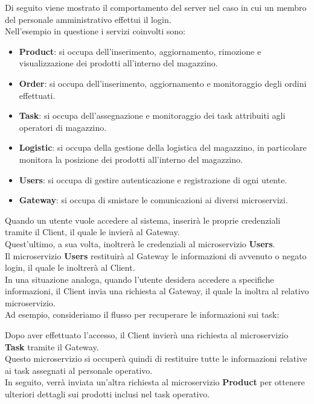 Di seguito viene mostrato il comportamento del server nel caso in cui un membro del personale amministrativo
effettui il login.\\ Nell’esempio in questione i servizi coinvolti sono:

\begin{itemize}
    \item \textbf{Product}: si occupa dell'inserimento, aggiornamento, rimozione e visualizzazione dei prodotti all'interno del magazzino.
    \item \textbf{Order}: si occupa dell'inserimento, aggiornamento e monitoraggio degli ordini effettuati.
    \item \textbf{Task}: si occupa dell'assegnazione e monitoraggio dei task attribuiti agli operatori di magazzino.
    \item \textbf{Logistic}: si occupa della gestione della logistica del magazzino, in particolare monitora la posizione dei prodotti all'interno del magazzino.
    \item \textbf{Users}: si occupa di gestire autenticazione e registrazione di ogni utente.
    \item \textbf{Gateway}: si occupa di smistare le comunicazioni ai diversi microservizi.
\end{itemize}

Quando un utente vuole accedere al sistema, inserirà le proprie credenziali tramite il Client, il quale
le invierà al Gateway.\\ Quest'ultimo, a sua volta, inoltrerà le credenziali al microservizio \textbf{Users}.\\
Il microservizio \textbf{Users} restituirà al Gateway le informazioni di avvenuto o negato login, il quale
le inoltrerà al Client. \\In una situazione analoga, quando l'utente desidera accedere a specifiche informazioni,
il Client invia una richiesta al Gateway, il quale la inoltra al relativo microservizio.\\Ad esempio, consideriamo
il flusso per recuperare le informazioni sui task:

Dopo aver effettuato l'accesso, il Client invierà una richiesta al microservizio \textbf{Task} tramite
il Gateway.\\ Questo microservizio si occuperà quindi di restituire tutte le informazioni relative ai task
assegnati al personale operativo.\\ In seguito, verrà inviata un'altra richiesta al
microservizio \textbf{Product} per ottenere ulteriori dettagli sui prodotti inclusi nel task operativo.

